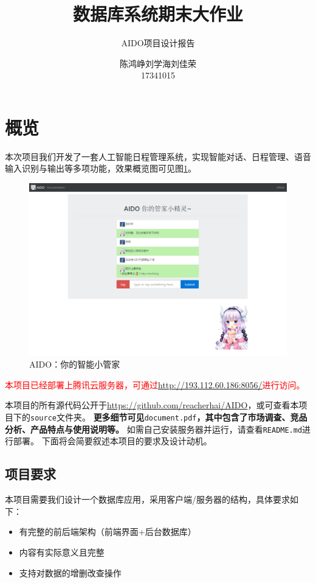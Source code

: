 \documentclass[logo,reportComp]{thesis}
\title{数据库系统期末大作业}
\subtitle{AIDO项目设计报告}
\author{陈鸿峥\qquad 刘学海\qquad 刘佳荣\\17341015\qquad 17341111\qquad 17341109}
\begin{document}
\maketitle

\section{概览}
本次项目我们开发了一套人工智能日程管理系统，实现智能对话、日程管理、语音输入识别与输出等多项功能，效果概览图可见图\ref{fig:overview}。
\begin{figure}[H]
\centering
\includegraphics[width=\linewidth]{fig/overview.png}
\caption{AIDO：你的智能小管家}
\label{fig:overview}
\end{figure}

\textcolor{red}{本项目已经部署上腾讯云服务器，可通过\url{http://193.112.60.186:8056/}进行访问。}

本项目的所有源代码公开于\url{https://github.com/reacherhai/AIDO}，或可查看本项目下的\verb'source'文件夹。
\textbf{更多细节可见}\verb'document.pdf'\textbf{，其中包含了市场调查、竞品分析、产品特点与使用说明等。}
如需自己安装服务器并运行，请查看\verb'README.md'进行部署。
下面将会简要叙述本项目的要求及设计动机。

\subsection{项目要求}
本项目需要我们设计一个数据库应用，采用客户端/服务器的结构，具体要求如下：
\begin{itemize}
\item 有完整的前后端架构（前端界面+后台数据库）
\item 内容有实际意义且完整
\item 支持对数据的增删改查操作
\end{itemize}
\end{document}
